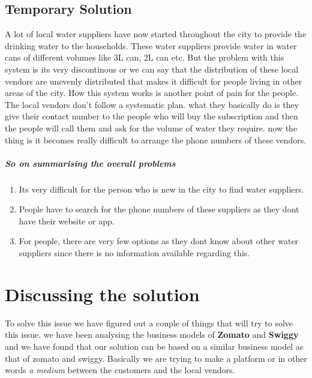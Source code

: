 \documentclass[a4paper, 12pt]{article}
\begin{document}
\subsection[short]{Temporary Solution}
A lot of local water suppliers have now started throughout the city to provide the drinking water to the households. These water suppliers provide water in water cans 
of different volumes like 3L can, 2L can etc. But the problem with this system is its very discontinous or we can say that the distribution of these local vendors are
unevenly distributed that makes it difficult for people living in other areas of the city. How this system works is another point of pain for the people. The local vendors
don't follow a systematic plan. what they basically do is they give their contact number to the people who will buy the subscription and then the people will call them and
ask for the volume of water they require. now the thing is it becomes really difficult to arrange the phone numbers of these vendors. 
\subparagraph*{So on summarising the overall problems}

\begin{enumerate}
    \item Its very difficult for the person who is new in the city to find water suppliers.
    \item People have to search for the phone numbers of these suppliers as they dont have their website or app.
    \item For people, there are very few options as they dont know about other water suppliers since there is no information available regarding this.
\end{enumerate}

\section*{Discussing the solution}
To solve this issue we have figured out a couple of things that will try to solve this issue. we have been analysing the business
models of \textbf{Zomato} and \textbf{Swiggy} and we have found that our solution can be based on a similar business model as that 
of zomato and swiggy. Basically we are trying to make a platform or in other words \textit{a medium} between the customers and the 
local vendors.
\end{document}
